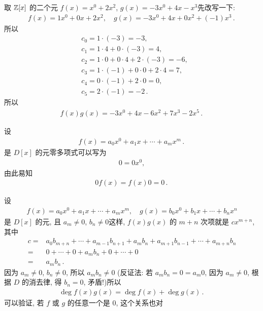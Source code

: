 \begin{example}
    取 $\mathbb{Z}[x]$ 的二个元 $f(x)=x^0 + 2x^2$, $g(x)=-3x^0 + 4x - x^3$\period 先改写一下:
    \begin{align*}
        f(x) = 1x^0 + 0x + 2x^2, \quad g(x) = -3x^0 + 4x + 0x^2 + (-1)x^3 \period
    \end{align*}
    所以
    \begin{align*}
         & c_0 = 1 \cdot (-3) = -3,                         \\
         & c_1 = 1 \cdot 4 + 0 \cdot (-3) = 4,              \\
         & c_2 = 1 \cdot 0 + 0 \cdot 4 + 2 \cdot (-3) = -6, \\
         & c_3 = 1 \cdot (-1) + 0 \cdot 0 + 2 \cdot 4 = 7,  \\
         & c_4 = 0 \cdot (-1) + 2 \cdot 0 = 0,              \\
         & c_5 = 2 \cdot (-1) = -2 \period
    \end{align*}
    所以
    \begin{align*}
        f(x) g(x) = -3x^0 + 4x - 6x^2 + 7x^3 - 2x^5 \period
    \end{align*}
\end{example}

\begin{example}
    设
    \begin{align*}
        f(x) = a_0 x^0 + a_1 x + \cdots + a_m x^m \period
    \end{align*}
    是 $D[x]$ 的元\period 零多项式可以写为
    \begin{align*}
        0 = 0x^0,
    \end{align*}
    由此易知
    \begin{align*}
        0f(x) = f(x)0 = 0\period
    \end{align*}
\end{example}

\begin{remark}
    设
    \begin{align*}
        f(x) = a_0 x^0 + a_1 x + \cdots + a_m x^m, \quad g(x) = b_0 x^0 + b_1 x + \cdots + b_n x^n
    \end{align*}
    是 $D[x]$ 的元, 且 $a_m \neq 0$, $b_n \neq 0$\period 这样, $f(x)g(x)$ 的 $m+n$ 次项就是 $cx^{m+n}$, 其中
    \begin{align*}
        c
        = {} & a_0 b_{m+n} + \cdots + a_{m-1} b_{n+1} + a_m b_n + a_{m+1} b_{n-1} + \cdots + a_{m+n}b_n \\
        = {} & 0 + \cdots + 0 + a_m b_n + 0 + \cdots + 0                                                \\
        = {} & a_m b_n \period
    \end{align*}
    因为 $a_m \neq 0$, $b_n \neq 0$, 所以 $a_m b_n \neq 0$ (反证法: 若 $a_m b_n = 0 = a_m 0$, 因为 $a_m \neq 0$, 根据 $D$ 的消去律, 得 $b_n = 0$, 矛盾!)\period 所以
    \begin{align*}
        \deg f(x) g(x) = \deg f(x) + \deg g(x) \period
    \end{align*}
    可以验证, 若 $f$ 或 $g$ 的任意一个是 $0$, 这个关系也对\period
\end{remark}

